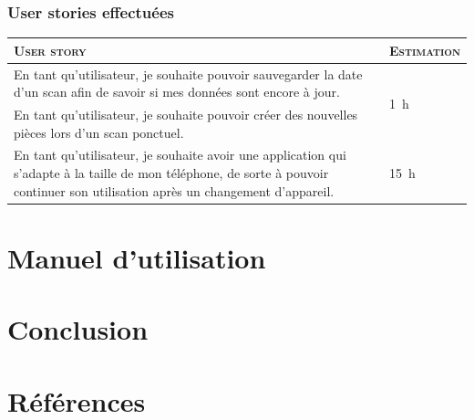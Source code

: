 \documentclass{elsarticle}
\newcommand{\est}[1]{\multirow{2}{*}{\SI{#1}{\hour}}}
\begin{document}
\subsubsection{User stories effectuées}
\begin{table}[H]
\centering
\begin{tabular}{p{14cm}m{2cm}}
	\toprule
	\textsc{User story} & \textsc{Estimation}\\
	\midrule
	En tant qu'utilisateur, je souhaite pouvoir sauvegarder la date d'un scan afin de savoir si mes données sont encore à jour. & \est{1}\\
	\midrule
	En tant qu'utilisateur, je souhaite pouvoir créer des nouvelles pièces lors d'un scan ponctuel. & \est{7}\\
	\midrule
	En tant qu'utilisateur, je souhaite avoir une application qui s'adapte à la taille de mon téléphone, de sorte à pouvoir continuer son utilisation après un changement d'appareil. & \est{15}\\
	\bottomrule
\end{tabular}
\end{table}

\section{Manuel d'utilisation}
\section{Conclusion}

\section*{Références}


\end{document}
